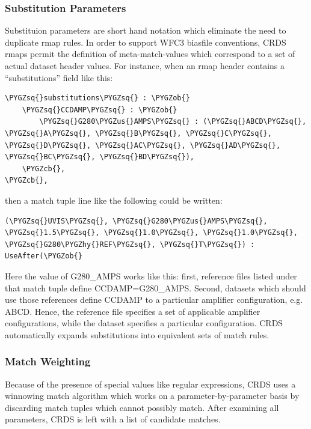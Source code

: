 \documentclass[letterpaper,10pt,english]{sphinxmanual}
\def\PYGZus{\char`\_}
\def\PYGZob{\char`\{}
\def\PYGZcb{\char`\}}
\def\PYGZhy{\char`\-}
\def\PYGZsq{\char`\'}
\begin{document}
\subsubsection{Substitution Parameters}
\label{rmap_syntax:substitution-parameters}
Substituion parameters are short hand notation which eliminate the need to
duplicate rmap rules.  In order to support WFC3 biasfile conventions,  CRDS
rmaps permit the definition of meta-match-values which correspond to a set of
actual dataset header values. For instance,  when an rmap header contains a
``substitutions'' field like this:

\begin{Verbatim}[commandchars=\\\{\}]
\PYGZsq{}substitutions\PYGZsq{} : \PYGZob{}
    \PYGZsq{}CCDAMP\PYGZsq{} : \PYGZob{}
        \PYGZsq{}G280\PYGZus{}AMPS\PYGZsq{} : (\PYGZsq{}ABCD\PYGZsq{}, \PYGZsq{}A\PYGZsq{}, \PYGZsq{}B\PYGZsq{}, \PYGZsq{}C\PYGZsq{}, \PYGZsq{}D\PYGZsq{}, \PYGZsq{}AC\PYGZsq{}, \PYGZsq{}AD\PYGZsq{}, \PYGZsq{}BC\PYGZsq{}, \PYGZsq{}BD\PYGZsq{}),
    \PYGZcb{},
\PYGZcb{},
\end{Verbatim}

then a match tuple line like the following could be written:

\begin{Verbatim}[commandchars=\\\{\}]
(\PYGZsq{}UVIS\PYGZsq{}, \PYGZsq{}G280\PYGZus{}AMPS\PYGZsq{}, \PYGZsq{}1.5\PYGZsq{}, \PYGZsq{}1.0\PYGZsq{}, \PYGZsq{}1.0\PYGZsq{}, \PYGZsq{}G280\PYGZhy{}REF\PYGZsq{}, \PYGZsq{}T\PYGZsq{}) : UseAfter(\PYGZob{}
\end{Verbatim}

Here the value of G280\_AMPS works like this:  first,   reference files listed
under that match tuple define CCDAMP=G280\_AMPS.   Second, datasets which should
use those references define CCDAMP to a particular amplifier configuration,
e.g.  ABCD.   Hence,  the reference file specifies a set of applicable
amplifier configurations,  while the dataset specifies a particular
configuration.   CRDS automatically expands substitutions into equivalent sets
of match rules.


\subsubsection{Match Weighting}
\label{rmap_syntax:match-weighting}
Because of the presence of special values like regular expressions, CRDS uses a
winnowing match algorithm which works on a parameter-by-parameter basis by
discarding match tuples which cannot possibly match. After examining all
parameters,   CRDS is left with a list of candidate matches.
\end{document}
